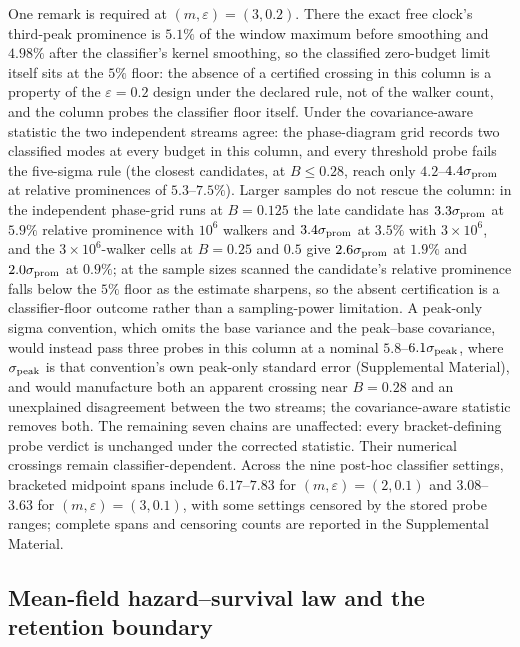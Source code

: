 \documentclass[aps,physrev,reprint,amsmath,amssymb,longbibliography,floatfix]{revtex4-2}
\begin{document}
One remark is required at \((m,\varepsilon)=(3,0.2)\).  There the exact
free clock's third-peak prominence is \(5.1\%\) of the window maximum before
smoothing and \(4.98\%\) after the classifier's kernel smoothing, so the
classified zero-budget limit itself sits at the \(5\%\) floor: the absence
of a certified crossing in this column is a property of the
\(\varepsilon=0.2\) design under the declared rule, not of the walker count,
and the column probes the classifier floor itself.  Under the
covariance-aware statistic the two independent streams agree: the
phase-diagram grid records two classified modes at every budget in this
column, and every threshold probe fails the five-sigma rule (the closest
candidates, at \(B\le0.28\), reach only \(4.2\)--\(4.4\sigma_{\rm prom}\) at relative
prominences of \(5.3\)--\(7.5\%\)).  Larger samples do not rescue the
column: in the independent phase-grid runs at \(B=0.125\) the late candidate
has \(3.3\sigma_{\rm prom}\) at \(5.9\%\) relative prominence with \(10^{6}\) walkers
and \(3.4\sigma_{\rm prom}\) at \(3.5\%\) with \(3\times10^{6}\), and the
\(3\times10^{6}\)-walker cells at \(B=0.25\) and \(0.5\) give \(2.6\sigma_{\rm prom}\)
at \(1.9\%\) and \(2.0\sigma_{\rm prom}\) at \(0.9\%\); at the sample sizes scanned the
candidate's relative prominence falls below the \(5\%\) floor as the
estimate sharpens, so the absent certification is a classifier-floor outcome
rather than a sampling-power limitation.  A
peak-only sigma convention, which omits the base variance and the
peak--base covariance, would instead pass three probes in this column at a
nominal \(5.8\)--\(6.1\sigma_{\rm peak}\), where \(\sigma_{\rm peak}\) is that
convention's own peak-only standard error (Supplemental Material), and
would manufacture both an apparent
crossing near \(B=0.28\) and an unexplained disagreement between the two
streams; the covariance-aware statistic removes both.  The remaining seven
chains are unaffected: every bracket-defining probe verdict is unchanged
under the corrected statistic.  Their numerical crossings remain
classifier-dependent.  Across the nine
post-hoc classifier settings, bracketed midpoint spans include \(6.17\)--\(7.83\)
for \((m,\varepsilon)=(2,0.1)\) and \(3.08\)--\(3.63\) for
\((m,\varepsilon)=(3,0.1)\), with some settings censored by the stored probe
ranges; complete
spans and censoring counts are reported in the Supplemental Material.

\subsection{Mean-field hazard--survival law and the retention boundary}
\label{sec:mean-field}
\end{document}
